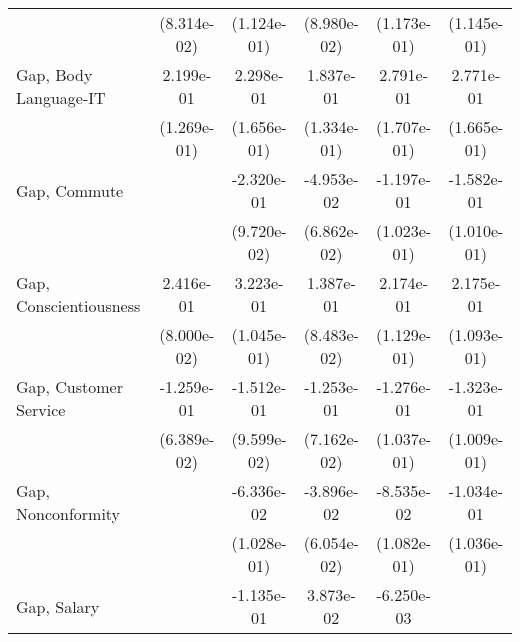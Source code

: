 {\begin{tabular}{l*{5}{c}}
                             & (8.314e-02)                 & (1.124e-01)                 & (8.980e-02)                 & (1.173e-01)                 & (1.145e-01)                 \\
    \addlinespace
    Gap, Body Language-IT    & 2.199e-01\sym{+}            & 2.298e-01                   & 1.837e-01                   & 2.791e-01                   & 2.771e-01\sym{+}            \\
                             & (1.269e-01)                 & (1.656e-01)                 & (1.334e-01)                 & (1.707e-01)                 & (1.665e-01)                 \\
    \addlinespace
    Gap, Commute             &                             & -2.320e-01\sym{++}          & -4.953e-02                  & -1.197e-01                  & -1.582e-01                  \\
                             &                             & (9.720e-02)                 & (6.862e-02)                 & (1.023e-01)                 & (1.010e-01)                 \\
    \addlinespace
    Gap, Conscientiousness   & 2.416e-01\sym{*}            & 3.223e-01\sym{*}            & 1.387e-01                   & 2.174e-01\sym{+}            & 2.175e-01\sym{++}           \\
                             & (8.000e-02)                 & (1.045e-01)                 & (8.483e-02)                 & (1.129e-01)                 & (1.093e-01)                 \\
    \addlinespace
    Gap, Customer Service    & -1.259e-01\sym{+}           & -1.512e-01                  & -1.253e-01\sym{+}           & -1.276e-01                  & -1.323e-01                  \\
                             & (6.389e-02)                 & (9.599e-02)                 & (7.162e-02)                 & (1.037e-01)                 & (1.009e-01)                 \\
    \addlinespace
    Gap, Nonconformity       &                             & -6.336e-02                  & -3.896e-02                  & -8.535e-02                  & -1.034e-01                  \\
                             &                             & (1.028e-01)                 & (6.054e-02)                 & (1.082e-01)                 & (1.036e-01)                 \\
    \addlinespace
    Gap, Salary              &                             & -1.135e-01                  & 3.873e-02                   & -6.250e-03                  &                             \\

\end{tabular}}

